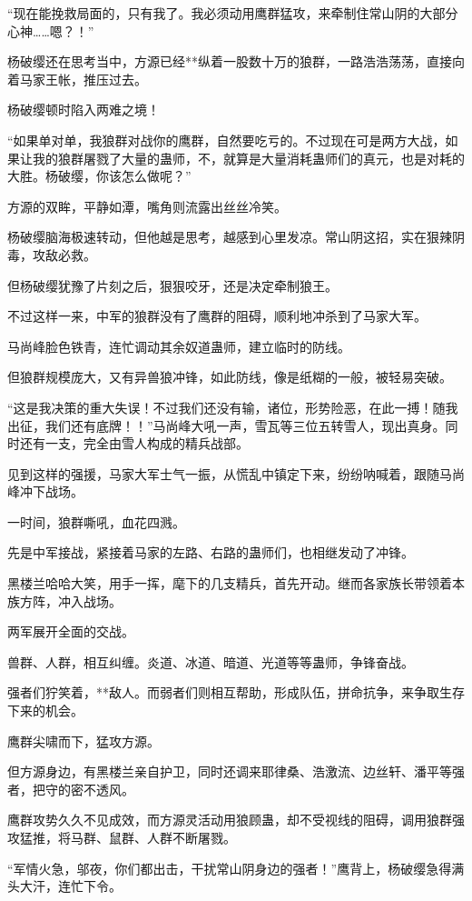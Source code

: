 \begin{this_body}
“现在能挽救局面的，只有我了。我必须动用鹰群猛攻，来牵制住常山阴的大部分心神……嗯？！”

杨破缨还在思考当中，方源已经**纵着一股数十万的狼群，一路浩浩荡荡，直接向着马家王帐，推压过去。

杨破缨顿时陷入两难之境！

“如果单对单，我狼群对战你的鹰群，自然要吃亏的。不过现在可是两方大战，如果让我的狼群屠戮了大量的蛊师，不，就算是大量消耗蛊师们的真元，也是对耗的大胜。杨破缨，你该怎么做呢？”

方源的双眸，平静如潭，嘴角则流露出丝丝冷笑。

杨破缨脑海极速转动，但他越是思考，越感到心里发凉。常山阴这招，实在狠辣阴毒，攻敌必救。

但杨破缨犹豫了片刻之后，狠狠咬牙，还是决定牵制狼王。

不过这样一来，中军的狼群没有了鹰群的阻碍，顺利地冲杀到了马家大军。

马尚峰脸色铁青，连忙调动其余奴道蛊师，建立临时的防线。

但狼群规模庞大，又有异兽狼冲锋，如此防线，像是纸糊的一般，被轻易突破。

“这是我决策的重大失误！不过我们还没有输，诸位，形势险恶，在此一搏！随我出征，我们还有底牌！！”马尚峰大吼一声，雪瓦等三位五转雪人，现出真身。同时还有一支，完全由雪人构成的精兵战部。

见到这样的强援，马家大军士气一振，从慌乱中镇定下来，纷纷呐喊着，跟随马尚峰冲下战场。

一时间，狼群嘶吼，血花四溅。

先是中军接战，紧接着马家的左路、右路的蛊师们，也相继发动了冲锋。

黑楼兰哈哈大笑，用手一挥，麾下的几支精兵，首先开动。继而各家族长带领着本族方阵，冲入战场。

两军展开全面的交战。

兽群、人群，相互纠缠。炎道、冰道、暗道、光道等等蛊师，争锋奋战。

强者们狞笑着，**敌人。而弱者们则相互帮助，形成队伍，拼命抗争，来争取生存下来的机会。

鹰群尖啸而下，猛攻方源。

但方源身边，有黑楼兰亲自护卫，同时还调来耶律桑、浩激流、边丝轩、潘平等强者，把守的密不透风。

鹰群攻势久久不见成效，而方源灵活动用狼顾蛊，却不受视线的阻碍，调用狼群强攻猛推，将马群、鼠群、人群不断屠戮。

“军情火急，邬夜，你们都出击，干扰常山阴身边的强者！”鹰背上，杨破缨急得满头大汗，连忙下令。


\end{this_body}
